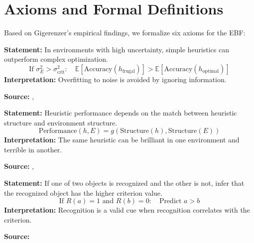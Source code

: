 \section{Axioms and Formal Definitions}
\label{sec:gi-axioms}

Based on Gigerenzer's empirical findings, we formalize six axioms for the EBF:

\begin{tcolorbox}[colback=gray!5!white, colframe=gray!75!black,
    title=Axiom GI-1: Less-is-More Effect]
\textbf{Statement:} In environments with high uncertainty, simple heuristics can outperform complex optimization.
\begin{equation}
\text{If } \sigma^2_E > \sigma^2_{\text{crit}}: \quad \mathbb{E}[\text{Accuracy}(h_{\text{frugal}})] > \mathbb{E}[\text{Accuracy}(h_{\text{optimal}})]
\end{equation}
\textbf{Interpretation:} Overfitting to noise is avoided by ignoring information.

\textbf{Source:} \citet{PAP-gigerenzer1999simple}, \citet{PAP-gigerenzer2009homo}
\end{tcolorbox}

\begin{tcolorbox}[colback=gray!5!white, colframe=gray!75!black,
    title=Axiom GI-2: Ecological Rationality]
\textbf{Statement:} Heuristic performance depends on the match between heuristic structure and environment structure.
\begin{equation}
\text{Performance}(h, E) = g(\text{Structure}(h), \text{Structure}(E))
\end{equation}
\textbf{Interpretation:} The same heuristic can be brilliant in one environment and terrible in another.

\textbf{Source:} \citet{gigerenzer2001bounded}, \citet{PAP-goldstein2002recognition}
\end{tcolorbox}

\begin{tcolorbox}[colback=gray!5!white, colframe=gray!75!black,
    title=Axiom GI-3: Recognition Heuristic]
\textbf{Statement:} If one of two objects is recognized and the other is not, infer that the recognized object has the higher criterion value.
\begin{equation}
\text{If } R(a) = 1 \text{ and } R(b) = 0: \quad \text{Predict } a > b
\end{equation}
\textbf{Interpretation:} Recognition is a valid cue when recognition correlates with the criterion.

\textbf{Source:} \citet{PAP-goldstein2002recognition}
\end{tcolorbox}

